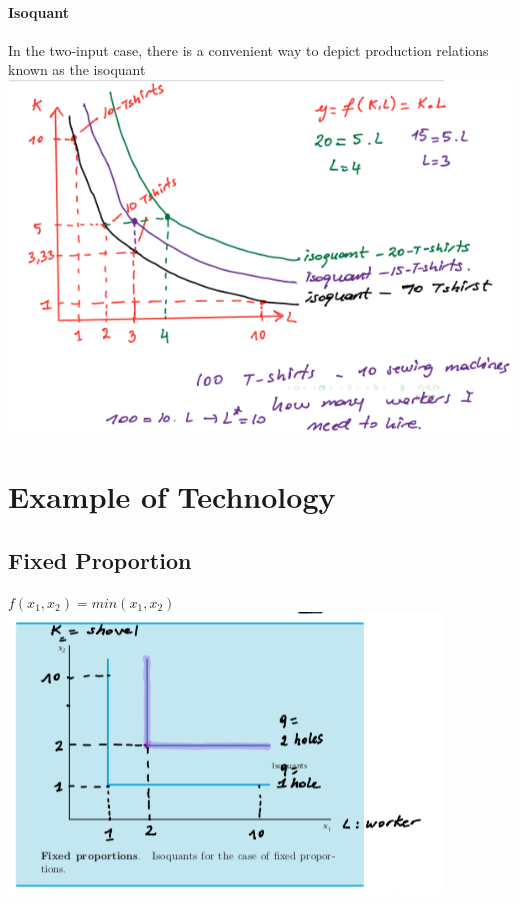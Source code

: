 \documentclass{report}
\begin{document}
\paragraph{Isoquant}
In the two-input case, there is a convenient way to depict production relations known as the isoquant\\\includegraphics[width = \textwidth]{econ2}

\section{Example of Technology}
\subsection{Fixed Proportion}
$f(x_1,x_2) = min(x_1,x_2)$\\
\includegraphics[width = \textwidth]{econ3}
\end{document}

